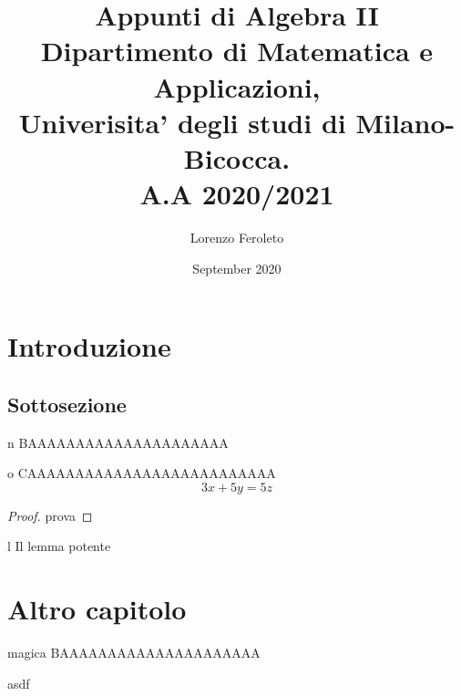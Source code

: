 \documentclass{article}
\title{
  \Large{\bf{Appunti di Algebra II}} \\
  Dipartimento di Matematica e Applicazioni,\\
  Univerisita' degli studi di Milano-Bicocca. \\
  A.A 2020/2021
}
\author{Lorenzo Feroleto}
\date{September 2020}
\begin{document}
\maketitle
\newpage

\section{Introduzione}

\subsection{Sottosezione}

\lipsum[2]

\begin{defn}{n}
BAAAAAAAAAAAAAAAAAAAAA
\end{defn}

\lipsum[3]

\begin{theo}{o}
CAAAAAAAAAAAAAAAAAAAAAAAAAA
\[3x + 5y = 5z\]
\end{theo}
\begin{proof}
prova
\end{proof}

\begin{lem}[Il lemmone]{l}
Il lemma potente
\end{lem}

\section{Altro capitolo}
\begin{defn}{magica}
  BAAAAAAAAAAAAAAAAAAAAA
\end{defn}

\begin{dimostrazione} 
asdf
\end{dimostrazione}
\end{document}
